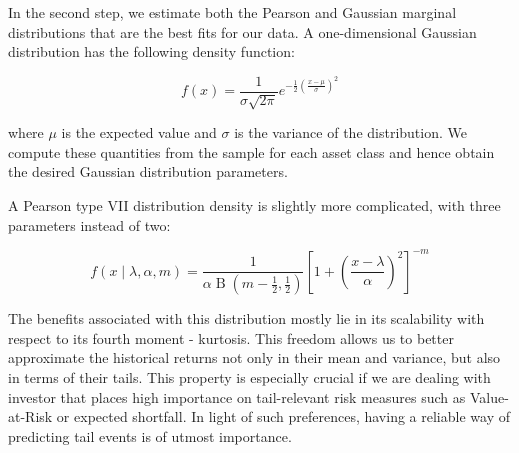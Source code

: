 In the second step, we estimate both the Pearson and Gaussian marginal distributions that are the best fits for our data. A one-dimensional Gaussian distribution has the following density function:

\begin{equation}
f(x)={\frac {1}{\sigma {\sqrt {2\pi }}}}e^{-{\frac {1}{2}}\left({\frac {x-\mu }{\sigma }}\right)^{2}}
\end{equation}

where $\mu$ is the expected value and $\sigma$ is the variance of the distribution. We compute these quantities from the sample for each asset class and hence obtain the desired Gaussian distribution parameters.

A Pearson type VII distribution density is slightly more complicated, with three parameters instead of two:


\begin{equation}
f(x\mid \lambda, \alpha, m)={\frac {1}{\alpha \operatorname {\mathrm {B} } \left(m-{\frac {1}{2}},{\frac {1}{2}}\right)}}\left[1+\left({\frac {x-\lambda }{\alpha }}\right)^{2}\right]^{-m}
\end{equation}

The benefits associated with this distribution mostly lie in its scalability with respect to its fourth moment - kurtosis. This freedom allows us to better approximate the historical returns not only in their mean and variance, but also in terms of their tails. This property is especially crucial if we are dealing with investor that places high importance on tail-relevant risk measures such as Value-at-Risk or expected shortfall. In light of such preferences, having a reliable way of predicting tail events is of utmost importance.

